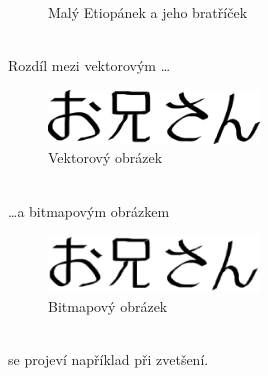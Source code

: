 \documentclass[a4paper, 11pt]{article}
\begin{document}
\begin{figure}[h]
{
}
\caption{Malý Etiopánek a jeho bratříček}
\label{fig:img1}
\end{figure}\\

Rozdíl mezi vektorovým \dots
\begin{figure}[h]
\centering
\includegraphics[width=0.5\textwidth]{oniisan.eps}
\caption{Vektorový obrázek}
\label{fig:img2}
\end{figure}\\
\dots a bitmapovým obrázkem
\begin{figure}[h]
\centering
\includegraphics[width=0.5\textwidth]{oniisan2.eps}
\caption{Bitmapový obrázek}
\label{fig:img3}
\end{figure}\\
se projeví například při zvetšení.
\end{document}
